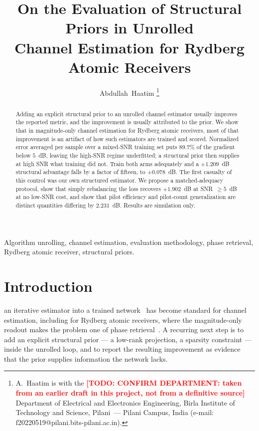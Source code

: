 \documentclass[journal]{IEEEtran}
\newcommand{\todo}[1]{\textcolor{red}{\textbf{[TODO: #1]}}}
\begin{document}
\title{On the Evaluation of Structural Priors in Unrolled\\
Channel Estimation for Rydberg Atomic Receivers}

\author{Abdullah~Haatim%
\thanks{A.~Haatim is with the \todo{CONFIRM DEPARTMENT: taken from an earlier
draft in this project, not from a definitive source} Department of Electrical
and Electronics Engineering, Birla Institute of Technology and Science,
Pilani~--- Pilani Campus, India (e-mail:
f20220519@pilani.bits-pilani.ac.in).}}

\maketitle

\begin{abstract}
Adding an explicit structural prior to an unrolled channel estimator usually
improves the reported metric, and the improvement is usually attributed to the
prior. We show that in magnitude-only channel estimation for Rydberg atomic
receivers, most of that improvement is an artifact of how such estimators are
trained and scored. Normalized error averaged per sample over a mixed-SNR
training set puts $89.7\%$ of the gradient below $5$~dB, leaving the
high-SNR regime underfitted; a structural prior then supplies at high SNR what
training did not. Train both arms adequately and a $+1.209$~dB structural
advantage falls by a factor of fifteen, to $+0.078$~dB. The first casualty of
this control was our own structured estimator. We propose a matched-adequacy
protocol, show that simply rebalancing the loss recovers $+1.902$~dB at
SNR~$\ge5$~dB at no low-SNR cost, and show that pilot efficiency and
pilot-count generalization are distinct quantities differing by $2.231$~dB.
Results are simulation only.
\end{abstract}

\begin{IEEEkeywords}
Algorithm unrolling, channel estimation, evaluation methodology, phase
retrieval, Rydberg atomic receiver, structural priors.
\end{IEEEkeywords}

\section{Introduction}

 an iterative estimator into a trained
network~\cite{gregor2010,monga2021} has become standard for channel estimation,
including for Rydberg atomic receivers, where the magnitude-only readout makes
the problem one of phase retrieval~\cite{xiao2026,cui2025}. A recurring next
step is to add an explicit structural prior --- a low-rank projection, a
sparsity constraint --- inside the unrolled loop, and to report the resulting
improvement as evidence that the prior supplies information the network lacks.
\end{document}
